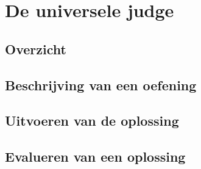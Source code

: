 \chapter{De universele judge}\label{ch:de-universele-judge}

\section{Overzicht}

\section{Beschrijving van een oefening}

\section{Uitvoeren van de oplossing}

\section{Evalueren van een oplossing}

